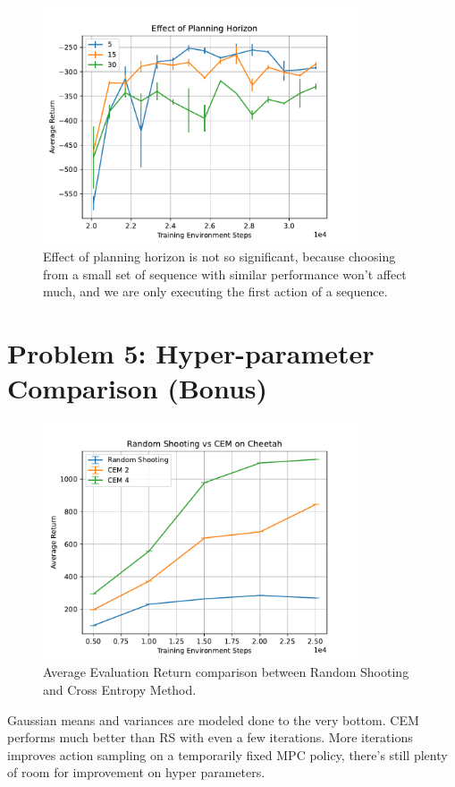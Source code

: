 \documentclass{article}
\begin{document}
\begin{answer}[title=Plot,height=9.5cm,width=\linewidth]
    \begin{figure}[H]
        \centering
        \includegraphics[height=7cm]{figs/P4_planning_horizon.pdf}
        \caption{Effect of planning horizon is not so significant, because choosing from a small set of sequence with similar performance won't affect much, and we are only executing the first action of a sequence.}
    \end{figure}
\end{answer}


\section{Problem 5: Hyper-parameter Comparison (Bonus)}
\begin{answer}[title=Plot,height=11.5cm,width=\linewidth]
    \begin{figure}[H]
        \centering
        \includegraphics[height=7cm]{figs/P5.pdf}
        \caption{Average Evaluation Return comparison between Random Shooting and Cross Entropy Method.}
    \end{figure}
    Gaussian means and variances are modeled done to the very bottom.
    CEM performs much better than RS with even a few iterations.
    More iterations improves action sampling on a temporarily fixed MPC policy, there's still plenty of room for improvement on hyper parameters.
\end{answer}
\end{document}
